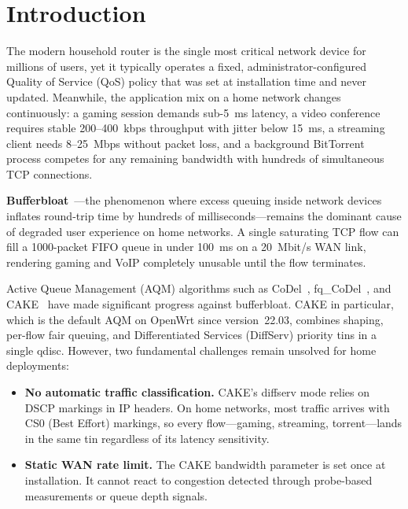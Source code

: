 
\chapter{Introduction}\label{chapter:introduction}

The modern household router is the single most critical network device for millions of users, yet it typically operates a fixed, administrator-configured Quality of Service (QoS) policy that was set at installation time and never updated. Meanwhile, the application mix on a home network changes continuously: a gaming session demands sub-5~ms latency, a video conference requires stable 200--400~kbps throughput with jitter below 15~ms, a streaming client needs 8--25~Mbps without packet loss, and a background BitTorrent process competes for any remaining bandwidth with hundreds of simultaneous TCP connections.

\textbf{Bufferbloat}~\cite{gettys2012}---the phenomenon where excess queuing inside network devices inflates round-trip time by hundreds of milliseconds---remains the dominant cause of degraded user experience on home networks. A single saturating TCP flow can fill a 1000-packet FIFO queue in under 100~ms on a 20~Mbit/s WAN link, rendering gaming and VoIP completely unusable until the flow terminates.

Active Queue Management (AQM) algorithms such as CoDel~\cite{nichols2012}, fq\_CoDel~\cite{hoeiland2018}, and CAKE~\cite{cake2018} have made significant progress against bufferbloat. CAKE in particular, which is the default AQM on OpenWrt since version~22.03, combines shaping, per-flow fair queuing, and Differentiated Services (DiffServ) priority tins in a single qdisc. However, two fundamental challenges remain unsolved for home deployments:

\begin{itemize}
  \item \textbf{No automatic traffic classification.} CAKE's diffserv mode relies on DSCP markings in IP headers. On home networks, most traffic arrives with CS0 (Best Effort) markings, so every flow---gaming, streaming, torrent---lands in the same tin regardless of its latency sensitivity.
  \item \textbf{Static WAN rate limit.} The CAKE bandwidth parameter is set once at installation. It cannot react to congestion detected through probe-based measurements or queue depth signals.
\end{itemize}

